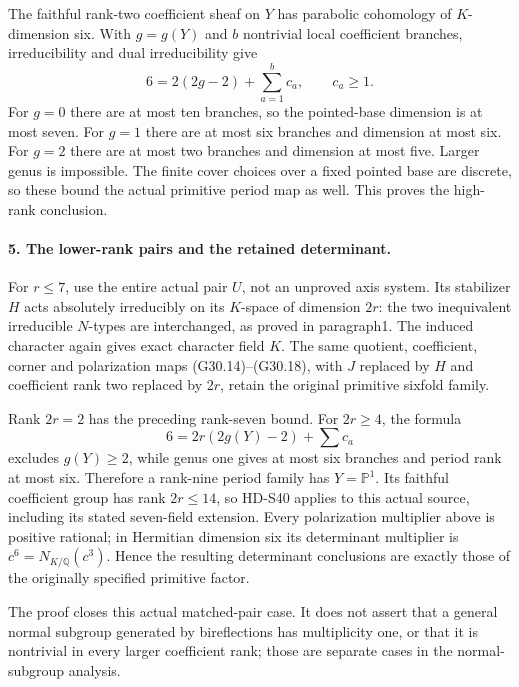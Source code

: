 The faithful rank-two coefficient sheaf on \(Y\) has
parabolic cohomology of \(K\)-dimension six. With
\(g=g(Y)\) and \(b\) nontrivial local coefficient
branches, irreducibility and dual irreducibility give
\[
                 6=2(2g-2)+\sum_{a=1}^b c_a,
                                      \qquad c_a\ge1.       \tag{G30.19}
\]
For \(g=0\) there are at most ten branches, so the
pointed-base dimension is at most seven. For \(g=1\)
there are at most six branches and dimension at most six.
For \(g=2\) there are at most two branches and dimension
at most five. Larger genus is impossible. The finite cover
choices over a fixed pointed base are discrete, so these
bound the actual primitive period map as well. This proves
the high-rank conclusion.

\paragraph{5. The lower-rank pairs and the retained determinant.}
For \(r\le7\), use the entire actual pair \(U\),
not an unproved axis system. Its stabilizer \(H\) acts
absolutely irreducibly on its \(K\)-space of dimension
\(2r\): the two inequivalent irreducible \(N\)-types
are interchanged, as proved in paragraph1. The induced
character again gives exact character field \(K\).
The same quotient, coefficient, corner and polarization maps
(G30.14)--(G30.18), with \(J\) replaced by \(H\)
and coefficient rank two replaced by \(2r\), retain the
original primitive sixfold family.

Rank \(2r=2\) has the preceding rank-seven bound. For
\(2r\ge4\), the formula
\[
                   6=2r(2g(Y)-2)+\sum c_a                 \tag{G30.20}
\]
excludes \(g(Y)\ge2\), while genus one gives at most
six branches and period rank at most six. Therefore a
rank-nine period family has \(Y=\mathbb P^1\). Its
faithful coefficient group has rank \(2r\le14\), so
HD-S40 applies to this actual source, including its stated
seven-field extension. Every polarization multiplier above
is positive rational; in Hermitian dimension six its
determinant multiplier is \(c^6=N_{K/\mathbb Q}(c^3)\).
Hence the resulting determinant conclusions are exactly those
of the originally specified primitive factor.

The proof closes this actual matched-pair case. It does not
assert that a general normal subgroup generated by
bireflections has multiplicity one, or that it is nontrivial
in every larger coefficient rank; those are separate cases
in the normal-subgroup analysis.
